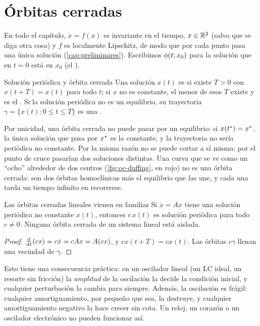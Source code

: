 \section{Órbitas cerradas}
\label{sec:oc-orbitas}

En todo el capítulo, $\dot x=f(x)$ es invariante en el tiempo, $x\in\mathbb{R}^2$ (salvo que se diga otra cosa) y $f$ es localmente Lipschitz, de modo que por cada punto pasa una única solución (\cref{cap:preliminares}). Escribimos $\phi(t;x_0)$ para la solución que en $t=0$ está en $x_0$ (el ).

\begin{definicion}[label=def:oc-orbita]{Solución periódica y órbita cerrada}
Una solución $x(t)$ es  si existe $T>0$ con $x(t+T)=x(t)$ para todo $t$; si $x$ no es constante, el menor de esos $T$ existe y es el . Si la solución periódica no es un equilibrio, su trayectoria $\gamma=\{x(t):0\le t\le T\}$ es una .
\end{definicion}

Por unicidad, una órbita cerrada no puede pasar por un equilibrio: si $x(t^*)=x^{*}$, la única solución que pasa por $x^{*}$ es la constante, y la trayectoria no sería periódica no constante. Por la misma razón no se puede cortar a sí misma: por el punto de cruce pasarían dos soluciones distintas. Una curva que se ve como un ``ocho'' alrededor de dos centros (\cref{fig:oc-duffing}, en rojo) no es una órbita cerrada: son dos órbitas homoclínicas más el equilibrio que las une, y cada una tarda un tiempo infinito en recorrerse.

\begin{proposicion}[label=prop:oc-lineal]{Las órbitas cerradas lineales vienen en familias}
Si $\dot x=Ax$ tiene una solución periódica no constante $x(t)$, entonces $c\,x(t)$ es solución periódica para todo $c\neq0$. Ninguna órbita cerrada de un sistema lineal está aislada.
\end{proposicion}

\begin{proof}
$\frac{\mathrm{d}}{\mathrm{d} t}(cx)=c\dot x=cAx=A(cx)$, y $cx(t+T)=cx(t)$. Las órbitas $c\gamma$ llenan una vecindad de $\gamma$.
\end{proof}

Esto tiene una consecuencia práctica: en un oscilador lineal (un LC ideal, un resorte sin fricción) la \emph{amplitud} de la oscilación la decide la condición inicial, y cualquier perturbación la cambia para siempre. Además, la oscilación es frágil: cualquier amortiguamiento, por pequeño que sea, la destruye, y cualquier amortiguamiento negativo la hace crecer sin cota. Un reloj, un corazón o un oscilador electrónico no pueden funcionar así.

